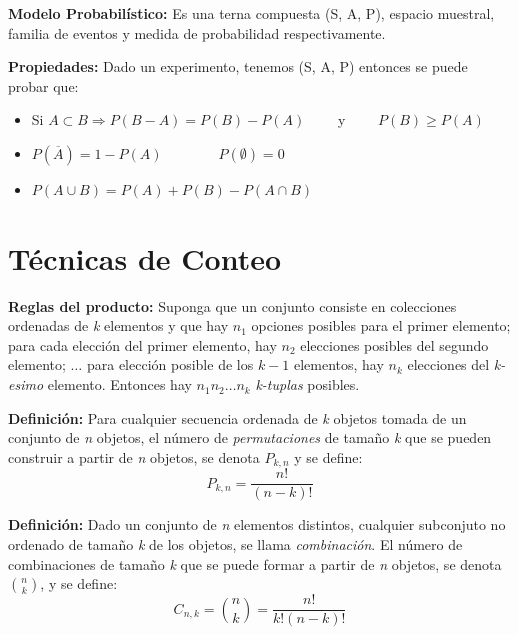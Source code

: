 \documentclass[12pt,a4paper]{report}
\begin{document}
		\vspace{3mm}
		\par \textbf{Modelo Probabilístico:} Es una terna compuesta (S, A, P), espacio muestral, familia de eventos y medida de probabilidad respectivamente.
		
		\vspace{3mm}
		\par \textbf{Propiedades:} Dado un experimento, tenemos (S, A, P) entonces se puede probar que:
		\begin{itemize}
			\item Si $A \subset B \Rightarrow P(B - A) = P(B) - P(A) \qquad$ y $\qquad P(B) \geq P(A)$
			\item $P(\overline{A}) = 1 - P(A) \qquad\qquad P(\emptyset) = 0$
			\item $P(A \cup B) = P(A) + P(B) - P(A \cap B)$
		\end{itemize}
		
	\section{Técnicas de Conteo}
		\par \textbf{Reglas del producto:} Suponga que un conjunto consiste en colecciones ordenadas de \textit{k} elementos y que hay $n_{1}$ opciones posibles para el primer elemento; para cada elección del primer elemento, hay $n_{2}$ elecciones posibles del segundo elemento; $\dotsc$ para elección posible de los $k - 1$ elementos, hay $n_{k}$ elecciones del \textit{k-esimo} elemento. Entonces hay $n_{1} n_{2} \dotsc n_{k}$ \textit{k-tuplas} posibles.
		
		\vspace{3mm}
		\par \textbf{Definición:} Para cualquier secuencia ordenada de \textit{k} objetos tomada de un conjunto de \textit{n} objetos, el número de \textit{permutaciones} de tamaño \textit{k} que se pueden construir a partir de \textit{n} objetos, se denota $P_{k, n}$ y se define:
		\[
			P_{k, n} = \frac{n!}{(n-k)!}
		\]
		
		\vspace{3mm}
		\par \textbf{Definición:} Dado un conjunto de \textit{n} elementos distintos, cualquier subconjuto no ordenado de tamaño \textit{k} de los objetos, se llama \textit{combinación}. El número de combinaciones de tamaño \textit{k} que se puede formar a partir de \textit{n} objetos, se denota ${n \choose k} $, y se define:
		\[
			C_{n, k} = {n \choose k}  = \frac{n!}{k! (n-k)!}
		\]
		
\end{document}
